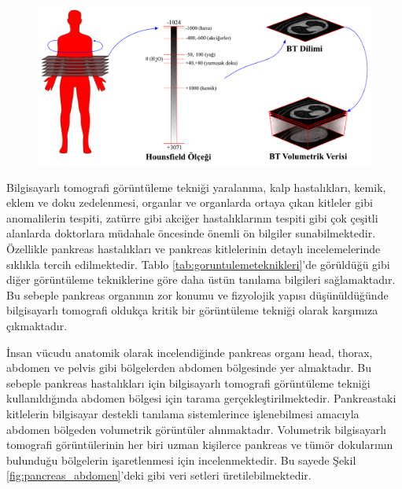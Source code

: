 \begin{figure}[h!]
	\begin{center}
		\vspace{0.4cm}
		{
			\vspace{0.4cm}
			\includegraphics[scale=0.55]{Genel-Bilgiler/Figures/ct_hounsfield.pdf}
		}
	\end{center}
\end{figure}

Bilgisayarlı tomografi görüntüleme tekniği yaralanma, kalp hastalıkları, kemik, eklem ve doku zedelenmesi, organlar ve organlarda ortaya çıkan kitleler gibi anomalilerin tespiti, zatürre gibi akciğer hastalıklarının tespiti gibi çok çeşitli alanlarda doktorlara müdahale öncesinde önemli ön bilgiler sunabilmektedir. Özellikle pankreas hastalıkları ve pankreas kitlelerinin detaylı incelemelerinde sıklıkla tercih edilmektedir. Tablo \ref{tab:goruntulemeteknikleri}'de görüldüğü gibi diğer görüntüleme tekniklerine göre daha üstün tanılama bilgileri sağlamaktadır. Bu sebeple pankreas organının zor konumu ve fizyolojik yapısı düşünüldüğünde bilgisayarlı tomografi oldukça kritik bir görüntüleme tekniği olarak karşımıza çıkmaktadır. 

İnsan vücudu anatomik olarak incelendiğinde pankreas organı head, thorax, abdomen ve pelvis gibi bölgelerden abdomen bölgesinde yer almaktadır. Bu sebeple pankreas hastalıkları için bilgisayarlı tomografi görüntüleme tekniği kullanıldığında abdomen bölgesi için tarama gerçekleştirilmektedir. Pankreastaki kitlelerin bilgisayar destekli tanılama sistemlerince işlenebilmesi amacıyla abdomen bölgeden volumetrik görüntüler alınmaktadır. Volumetrik bilgisayarlı tomografi görüntülerinin her biri uzman kişilerce pankreas ve tümör dokularının bulunduğu bölgelerin işaretlenmesi için incelenmektedir. Bu sayede Şekil \ref{fig:pancreas_abdomen}'deki gibi veri setleri üretilebilmektedir. 

